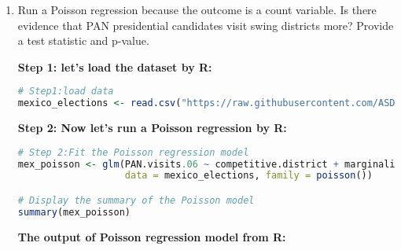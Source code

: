 \documentclass[12pt,letterpaper]{article}
\begin{document}
\begin{enumerate}
	\item [(a)]
	Run a Poisson regression because the outcome is a count variable. Is there evidence that PAN presidential candidates visit swing districts more? Provide a test statistic and p-value.
 
\textbf{ Step 1: let's load the dataset by R:}
 \begin{lstlisting}[language=R]
# Step1:load data
mexico_elections <- read.csv("https://raw.githubusercontent.com/ASDS-TCD/StatsII_Spring2024/main/datasets/MexicoMuniData.csv")
\end{lstlisting}

\textbf{Step 2: Now let's run a Poisson regression by R:}
\begin{lstlisting}[language=R]
# Step 2:Fit the Poisson regression model
mex_poisson <- glm(PAN.visits.06 ~ competitive.district + marginality.06 + PAN.governor.06, 
                   data = mexico_elections, family = poisson())

# Display the summary of the Poisson model
summary(mex_poisson)
\end{lstlisting}
\textbf{The output of Poisson regression model from R:}
\begin{table}[ht]
\centering
\caption{Summary of the generalized linear model (GLM) for predicting PAN visits in 2006 using Poisson regression.}


\end{table}
\end{enumerate}
\end{document}
